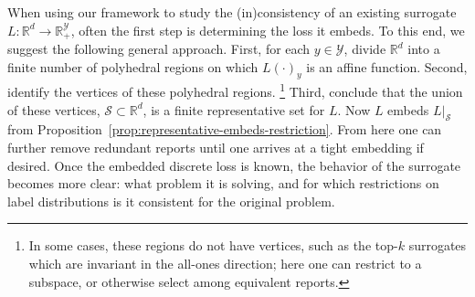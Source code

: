 \documentclass[11pt]{article}
\newcommand{\Comments}{1}
\newcommand{\mynote}[2]{\ifnum\Comments=1\textcolor{#1}{#2}\fi}
\newcommand{\jessie}[1]{\mynote{teal}{[JF: #1]}}
\newcommand{\reals}{\mathbb{R}}
\newcommand{\prop}[1]{\mathrm{prop}[#1]}
\newcommand{\Sc}{\mathcal{S}}
\newcommand{\Y}{\mathcal{Y}}
\begin{document}
When using our framework to study the (in)consistency of an existing surrogate $L:\reals^d \to \reals^\Y_+$, often the first step is determining the loss it embeds.
To this end, we suggest the following general approach.
First, for each $y\in\Y$, divide $\reals^d$ into a finite number of polyhedral regions on which $L(\cdot)_y$ is an affine function.
Second, identify the vertices of these polyhedral regions.%
\footnote{In some cases, these regions do not have vertices, such as the top-$k$ surrogates which are invariant in the all-ones direction; here one can restrict to a subspace, or otherwise select among equivalent reports.}
Third, conclude that the union of these vertices, $\Sc\subset\reals^d$, is a finite representative set for $L$.
Now $L$ embeds $L|_\Sc$ from Proposition~\ref{prop:representative-embeds-restriction}.
From here one can further remove redundant reports until one arrives at a tight embedding if desired.
Once the embedded discrete loss is known, the behavior of the surrogate becomes more clear: what problem it is solving, and for which restrictions on label distributions is it consistent for the original problem.
\end{document}

